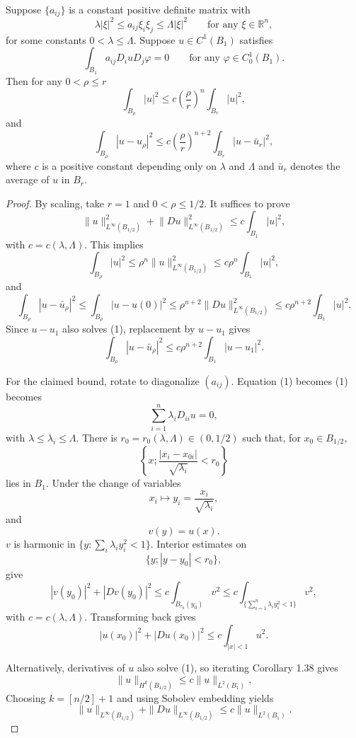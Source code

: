 \begin{lemma}\label{hanlin:lemma-constant-coeff-compactness}
Suppose $\{a_{ij}\}$ is a constant positive definite matrix with
\[
\lambda |\xi|^2 \le a_{ij}\xi_i\xi_j \le \Lambda |\xi|^2 \qquad \text{for any } \xi \in \mathbb{R}^n,
\]
for some constants $0 < \lambda \le \Lambda$. Suppose $u \in C^1(B_1)$ satisfies
\begin{equation}
\int_{B_1} a_{ij}D_i u D_j \varphi = 0 \qquad \text{for any } \varphi \in C_0^1(B_1).
\end{equation}
Then for any $0 < \rho \le r$
\begin{equation}
\int_{B_\rho} |u|^2 \le c \left(\frac{\rho}{r}\right)^n \int_{B_r} |u|^2,
\end{equation}
and
\begin{equation}
\int_{B_\rho} |u-u_\rho|^2 \le c \left(\frac{\rho}{r}\right)^{n+2} \int_{B_r} |u-\bar{u}_r|^2,
\end{equation}
where $c$ is a positive constant depending only on $\lambda$ and $\Lambda$ and $\bar{u}_r$ denotes the average
of $u$ in $B_r$.
\end{lemma}

\begin{proof}
\sketch By scaling, take $r=1$ and $0<\rho\le1/2$. It suffices to prove
\[
\lVert u \rVert_{L^\infty(B_{1/2})}^2 + \lVert Du \rVert_{L^\infty(B_{1/2})}^2 \le c \int_{B_1} |u|^2,
\]
with $c=c(\lambda,\Lambda)$. This implies
\[
\int_{B_\rho} |u|^2 \le \rho^n \lVert u \rVert_{L^\infty(B_{1/2})}^2 \le c\rho^n \int_{B_1} |u|^2,
\]
and
\[
\int_{B_\rho} |u-\bar{u}_\rho|^2 \le \int_{B_\rho} |u-u(0)|^2 \le \rho^{n+2}\lVert Du \rVert_{L^\infty(B_{1/2})}^2 \le c\rho^{n+2}\int_{B_1} |u|^2.
\]
Since $u-u_1$ also solves (1), replacement by $u-u_1$ gives
\[
\int_{B_\rho} |u-\bar{u}_\rho|^2 \le c\rho^{n+2}\int_{B_1} |u-u_1|^2.
\]

For the claimed bound, rotate to diagonalize $(a_{ij})$. Equation (1) becomes
(1) becomes
\[
\sum_{i=1}^n \lambda_i D_{ii}u = 0,
\]
with $\lambda\le\lambda_i\le\Lambda$. There is
$r_0=r_0(\lambda,\Lambda)\in(0,1/2)$ such that, for $x_0\in B_{1/2}$,
\[
\left\{x; \frac{|x_i-x_{0i}|}{\sqrt{\lambda_i}} < r_0 \right\}
\]
lies in $B_1$. Under the change of variables
\[
x_i \mapsto y_i = \frac{x_i}{\sqrt{\lambda_i}},
\]
and
\[
v(y)=u(x).
\]
$v$ is harmonic in $\{y:\sum_i\lambda_i y_i^2<1\}$. Interior estimates on
\[
\{y;|y-y_0|<r_0\},
\]
give
\[
|v(y_0)|^2+|Dv(y_0)|^2 \le c \int_{B_{r_0}(y_0)} v^2 \le c \int_{\{\sum_{i=1}^n \lambda_i y_i^2<1\}} v^2,
\]
with $c=c(\lambda,\Lambda)$. Transforming back gives
\[
|u(x_0)|^2+|Du(x_0)|^2 \le c \int_{|x|<1} u^2.
\]

Alternatively, derivatives of $u$ also solve (1), so iterating Corollary 1.38 gives
\[
\|u\|_{H^k(B_{1/2})} \le c\|u\|_{L^2(B_1)},
\]
Choosing $k=[n/2]+1$ and using Sobolev embedding yields
\[
\|u\|_{L^\infty(B_{1/2})}+\|Du\|_{L^\infty(B_{1/2})} \le c\|u\|_{L^2(B_1)}.
\]
\end{proof}
